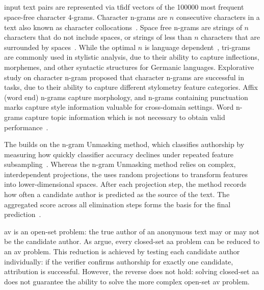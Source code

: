 \subsection{\impAppr{}}
\label{sec:impostor_method_theory}

\impAppr{} input text pairs are represented via \ac{tfidf} vectors of the \num{100000} most frequent space-free character 4-grams.
Character n-grams are $n$ consecutive characters in a text also known as character collocations~\citep{neal_surveying_2018}.
Space free n-grams are strings of $n$ characters that do not include spaces, or strings of less than $n$ characters that are surrounded by spaces~\citep{koppel_authorship_2011}.
While the optimal $n$ is language dependent~\citep{neal_surveying_2018}, tri-grams are commonly used in stylistic analysis, due to their ability to capture inflections, %
morphemes, %
and other syntactic structures for Germanic languages.
Explorative study on character n-gram proposed that character n-grams are successful in \ai{} tasks, due to their ability to capture different stylometry feature categories.
Affix (word end) n-grams capture morphology, and n-grams containing punctuation marks capture style information valuable for cross-domain settings.
Word n-grams capture topic information which is not necessary to obtain valid performance~\citep{Sapkota_ngrams_2015}.

The \impAppr{} builds on the n-gram Unmasking method, which classifies authorship by measuring how quickly classifier accuracy declines under repeated feature subsampling~\citep{koppel_authorship_2004}. 
Whereas the n-gram Unmasking method relies on complex, interdependent projections, the \impAppr{} uses random projections to transform features into lower-dimensional spaces.
After each projection step, the method records how often a candidate author is predicted as the source of the text. 
The aggregated score across all elimination steps forms the basis for the final prediction~\citep{tyo_state_2022}.

\ac{av} is an open-set problem: the true author of an anonymous text may or may not be the candidate author. 
As \citet{koppel_determining_2014} argue, every closed-set \ac{aa} problem can be reduced to an \ac{av} problem. 
This reduction is achieved by testing each candidate author individually: if the verifier confirms authorship for exactly one candidate, attribution is successful. 
However, the reverse does not hold: solving closed-set \ac{aa} does not guarantee the ability to solve the more complex open-set \ac{av} problem.

